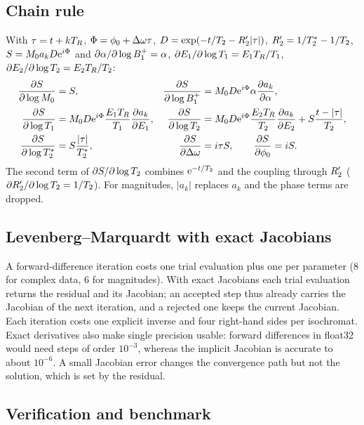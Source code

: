 \subsection{Chain rule}

With $\tau=t+kT_R$, $\Phi=\phi_0+\Delta\omega\tau$, $D=\exp(-t/T_2-R_2'|\tau|)$, $R_2'=1/T_2^{*}-1/T_2$,
$S=M_0 a_kD\mathrm{e}^{i\Phi}$ and $\partial\alpha/\partial\log B_1^{+}=\alpha$, $\partial E_1/\partial\log T_1=E_1T_R/T_1$,
$\partial E_2/\partial\log T_2=E_2T_R/T_2$:
\begin{align}
  \frac{\partial S}{\partial\log M_0}&=S, &
  \frac{\partial S}{\partial\log B_1^{+}}&=M_0 D\mathrm{e}^{i\Phi}\alpha\frac{\partial a_k}{\partial\alpha},\nonumber\\
  \frac{\partial S}{\partial\log T_1}&=M_0 D\mathrm{e}^{i\Phi}\frac{E_1T_R}{T_1}\frac{\partial a_k}{\partial E_1}, &
  \frac{\partial S}{\partial\log T_2}&=M_0 D\mathrm{e}^{i\Phi}\frac{E_2T_R}{T_2}\frac{\partial a_k}{\partial E_2}+S\frac{t-|\tau|}{T_2},\\
  \frac{\partial S}{\partial\log T_2^{*}}&=S\frac{|\tau|}{T_2^{*}}, &
  \frac{\partial S}{\partial\Delta\omega}&=i\tau S,\qquad\frac{\partial S}{\partial\phi_0}=iS .\nonumber
\end{align}
The second term of $\partial S/\partial\log T_2$ combines $\mathrm{e}^{-t/T_2}$ and the coupling through $R_2'$
($\partial R_2'/\partial\log T_2=1/T_2$). For magnitudes, $|a_k|$ replaces $a_k$ and the phase terms are dropped.

\subsection{Levenberg--Marquardt with exact Jacobians}

A forward-difference iteration costs one trial evaluation plus one per parameter (8 for
complex data, 6 for magnitudes). With exact Jacobians each trial evaluation returns the
residual and its Jacobian; an accepted step thus already carries the Jacobian of the next
iteration, and a rejected one keeps the current Jacobian. Each iteration costs one explicit
inverse and four right-hand sides per isochromat. Exact derivatives also make single
precision usable: forward differences in float32 would need steps of order $10^{-3}$, whereas
the implicit Jacobian is accurate to about $10^{-6}$. A small Jacobian error changes the
convergence path but not the solution, which is set by the residual.

\subsection{Verification and benchmark}

